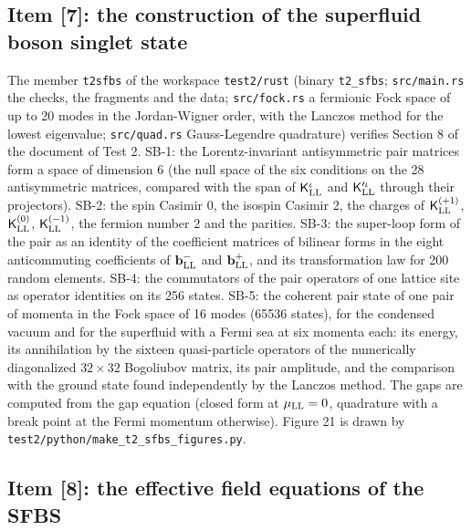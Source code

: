 \documentclass[
  10pt,
]{article}
\begin{document}
\hypertarget{item-7-the-construction-of-the-superfluid-boson-singlet-state}{%
\subsection{Item {[}7{]}: the construction of the superfluid boson
singlet
state}\label{item-7-the-construction-of-the-superfluid-boson-singlet-state}}

The member \texttt{t2sfbs} of the workspace \texttt{test2/rust} (binary
\texttt{t2\_sfbs}; \texttt{src/main.rs} the checks, the fragments and
the data; \texttt{src/fock.rs} a fermionic Fock space of up to 20 modes
in the Jordan-Wigner order, with the Lanczos method for the lowest
eigenvalue; \texttt{src/quad.rs} Gauss-Legendre quadrature) verifies
Section 8 of the document of Test 2. SB-1: the Lorentz-invariant
antisymmetric pair matrices form a space of dimension 6 (the null space
of the six conditions on the 28 antisymmetric matrices, compared with
the span of \(\mathsf K^\iota_{\rm LL}\) and
\(\mathsf K'^\iota_{\rm LL}\) through their projectors). SB-2: the spin
Casimir 0, the isospin Casimir 2, the charges of
\(\mathsf K^{(+1)}_{\rm LL}\), \(\mathsf K^{(0)}_{\rm LL}\),
\(\mathsf K^{(-1)}_{\rm LL}\), the fermion number 2 and the parities.
SB-3: the super-loop form of the pair as an identity of the coefficient
matrices of bilinear forms in the eight anticommuting coefficients of
\(\mathbf b^-_{\rm LL}\) and \(\mathbf b^+_{\rm LL}\), and its
transformation law for 200 random elements. SB-4: the commutators of the
pair operators of one lattice site as operator identities on its 256
states. SB-5: the coherent pair state of one pair of momenta in the Fock
space of 16 modes (65536 states), for the condensed vacuum and for the
superfluid with a Fermi sea at six momenta each: its energy, its
annihilation by the sixteen quasi-particle operators of the numerically
diagonalized \(32\times32\) Bogoliubov matrix, its pair amplitude, and
the comparison with the ground state found independently by the Lanczos
method. The gaps are computed from the gap equation (closed form at
\(\mu_{\rm LL}=0\), quadrature with a break point at the Fermi momentum
otherwise). Figure 21 is drawn by
\texttt{test2/python/make\_t2\_sfbs\_figures.py}.

\hypertarget{item-8-the-effective-field-equations-of-the-sfbs}{%
\subsection{Item {[}8{]}: the effective field equations of the
SFBS}\label{item-8-the-effective-field-equations-of-the-sfbs}}
\end{document}
